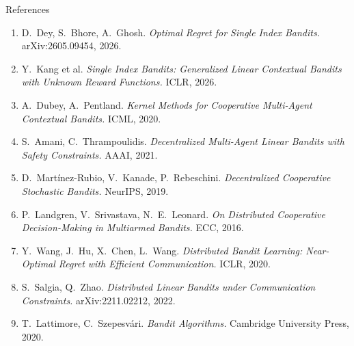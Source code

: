 \documentclass[11pt]{beamer}
\begin{document}
\begin{frame}{References}
\footnotesize
\begin{enumerate}
\item D.~Dey, S.~Bhore, A.~Ghosh. \emph{Optimal Regret for Single Index Bandits.} arXiv:2605.09454, 2026.
\item Y.~Kang et al. \emph{Single Index Bandits: Generalized Linear Contextual Bandits with Unknown Reward Functions.} ICLR, 2026.
\item A.~Dubey, A.~Pentland. \emph{Kernel Methods for Cooperative Multi-Agent Contextual Bandits.} ICML, 2020.
\item S.~Amani, C.~Thrampoulidis. \emph{Decentralized Multi-Agent Linear Bandits with Safety Constraints.} AAAI, 2021.
\item D.~Mart\'inez-Rubio, V.~Kanade, P.~Rebeschini. \emph{Decentralized Cooperative Stochastic Bandits.} NeurIPS, 2019.
\item P.~Landgren, V.~Srivastava, N.~E.~Leonard. \emph{On Distributed Cooperative Decision-Making in Multiarmed Bandits.} ECC, 2016.
\item Y.~Wang, J.~Hu, X.~Chen, L.~Wang. \emph{Distributed Bandit Learning: Near-Optimal Regret with Efficient Communication.} ICLR, 2020.
\item S.~Salgia, Q.~Zhao. \emph{Distributed Linear Bandits under Communication Constraints.} arXiv:2211.02212, 2022.
\item T.~Lattimore, C.~Szepesv\'ari. \emph{Bandit Algorithms.} Cambridge University Press, 2020.
\end{enumerate}
\end{frame}


\end{document}
